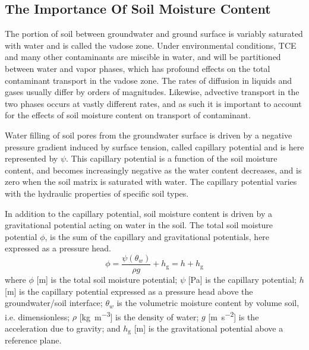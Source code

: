 \begin{comment}

To cover:

- Description of the physics that cause the variable soil moisture
- Modeling this
  - Correy & Brooks
  - van Genuchten

- Description of van Genuchten


\end{comment}

\subsection{The Importance Of Soil Moisture Content}\label{sec:van_genuchten}

The portion of soil between groundwater and ground surface is variably saturated with water and is called the vadose zone.
Under environmental conditions, TCE and many other contaminants are miscible in water, and will be partitioned between water and vapor phases, which has profound effects on the total contaminant transport in the vadose zone.
The rates of diffusion in liquids and gases usually differ by orders of magnitudes.
Likewise, advective transport in the two phases occurs at vastly different rates, and as such it is important to account for the effects of soil moisture content on transport of contaminant.\par

Water filling of soil pores from the groundwater surface is driven by a negative pressure gradient induced by surface tension, called capillary potential and is here represented by $\psi$.
This capillary potential is a function of the soil moisture content, and becomes increasingly negative as the water content decreases, and is zero when the soil matrix is saturated with water.
The capillary potential varies with the hydraulic properties of specific soil types.\par

In addition to the capillary potential, soil moisture content is driven by a gravitational potential acting on water in the soil.
The total soil moisture potential $\phi$, is the sum of the capillary and gravitational potentials, here expressed as a pressure head.
\begin{equation}
  \phi = \frac{\psi(\theta_w)}{\rho g} + h_\mathrm{g} = h + h_\mathrm{g}
\end{equation}
where $\phi$ [\si{\metre}] is the total soil moisture potential;
$\psi$ [\si{\pascal}] is the capillary potential;
$h$ [\si{\metre}] is the capillary potential expressed as a pressure head above the groundwater/soil interface;
$\theta_w$ is the volumetric moisture content by volume soil, i.e. dimensionless;
$\rho$ [\si{\kilo\gram\per\metre\cubed}] is the density of water;
$g$ [\si{\metre\per\second\squared}] is the acceleration due to gravity;
and $h_\mathrm{g}$ [\si{\metre}] is the gravitational potential above a reference plane.\par

